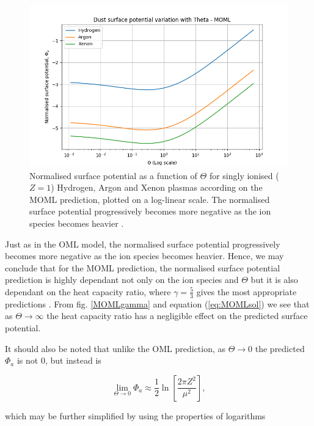 \documentclass[journal]{Imperial_lab_report}
\begin{document}
\begin{figure}[H]
\centering
\includegraphics[width=\linewidth]{Output/MOMLgraph.jpeg}
\caption{Normalised surface potential as a function of $\Theta$ for singly ionised ($Z = 1$) Hydrogen, Argon and Xenon plasmas according on the MOML prediction, plotted on a log-linear scale. The normalised surface potential progressively becomes more negative as the ion species becomes heavier \cite{Thomas}.}
\label{MOMLgraph} 
\end{figure}

Just as in the OML model, the normalised surface potential progressively becomes more negative as the ion species becomes heavier. Hence, we may conclude that for the MOML prediction, the normalised surface potential prediction is highly dependant not only on the ion species and $\Theta$ but it is also dependant on the heat capacity ratio, where $\gamma = \frac{5}{3}$ gives the most appropriate predictions \cite{Willis}. From fig. \ref{MOMLgamma} and equation (\ref{eq:MOMLsol}) we see that as $\Theta \xrightarrow{} \infty$ the heat capacity ratio has a negligible effect on the predicted surface potential. 

\medskip

\noindent It should also be noted that unlike the OML prediction, as $\Theta \xrightarrow{} 0$ the predicted $\Phi_a$ is not 0, but instead is 

\begin{equation}\label{eq:MOMlLimNotSimplified}
\lim_{\Theta \to 0} \Phi_a \approx \frac{1}{2}\ln{\left[\frac{2\pi Z^2}{\mu^2}\right]},
\end{equation}

\noindent which may be further simplified by using the properties of logarithms 
\end{document}
